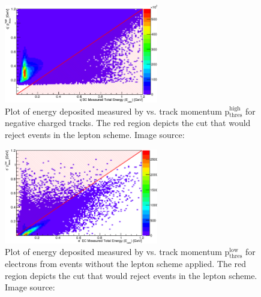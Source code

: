 \begin{figure}\begin{center}
\includegraphics[width=0.6\textwidth]{figures/lepton/Pim_EChigh.eps}
\caption[ Deposited Energy Comparison to Upper Threshold Track Momentum for q$^-$ Tracks]{\label{fig:islep.pimEChigh}Plot of energy deposited measured by  vs. track momentum p$\mathrm{_{thres}^{high}}$ for negative charged tracks. The red region depicts the cut that would reject events in the  lepton   scheme. Image source:~\cite{clas.thesis.kunkel}}
\end{center}\end{figure}


\begin{figure}\begin{center}
\includegraphics[width=0.6\textwidth]{figures/lepton/Pim_EClowcut.eps}
\caption[ Deposited Energy Comparison to Track Momentum for e$^-$ Candidates]{\label{fig:islep.pimEC}Plot of energy deposited measured by  vs. track momentum p$\mathrm{_{thres}^{low}}$ for electrons from \π[0] events without the  lepton   scheme applied. The red region depicts the cut that would reject events in the  lepton   scheme. Image source:~\cite{clas.thesis.kunkel}}
\end{center}\end{figure}

